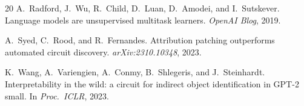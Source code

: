 \documentclass[11pt,a4paper]{article}
\begin{document}
\begin{thebibliography}{20}
A.~Radford, J.~Wu, R.~Child, D.~Luan, D.~Amodei, and I.~Sutskever.
\newblock Language models are unsupervised multitask learners.
\newblock \emph{OpenAI Blog}, 2019.

A.~Syed, C.~Rood, and R.~Fernandes.
\newblock Attribution patching outperforms automated circuit discovery.
\newblock \emph{arXiv:2310.10348}, 2023.

K.~Wang, A.~Variengien, A.~Conmy, B.~Shlegeris, and J.~Steinhardt.
\newblock Interpretability in the wild: a circuit for indirect object identification in {GPT-2} small.
\newblock In \emph{Proc.\ ICLR}, 2023.

\end{thebibliography}
\end{document}
